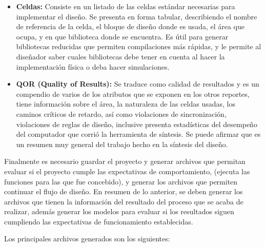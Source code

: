 \begin{itemize}
\item \textbf{Celdas:} {Consiste en un listado de las celdas estándar necesarias para implementar el diseño. Se presenta en forma tabular, describiendo el nombre de referencia de la celda, el bloque de diseño donde es usada, el área que ocupa, y en que biblioteca donde se encuentra. Es útil para generar bibliotecas reducidas que permiten compilaciones más rápidas, y le permite al diseñador saber cuales bibliotecas debe tener en cuenta al hacer la implementación física o deba hacer simulaciones.}


\item \textbf{QOR (Quality of Results):} {Se traduce como calidad de resultados y es un compendio de varios de los atributos que se exponen en los otros reportes, tiene información sobre el área, la naturaleza de las celdas usadas, los caminos críticos de retardo, así como violaciones de sincronización, violaciones de reglas de diseño, inclusive presenta estadísticas del desempeño del computador que corrió la herramienta de síntesis. Se puede afirmar que es un resumen muy general del trabajo hecho en la síntesis del diseño.}
\end{itemize}

Finalmente es necesario guardar el proyecto y generar archivos que permitan evaluar si el proyecto cumple las expectativas de comportamiento, (ejecuta las funciones para las que fue concebido), y generar los archivos que permiten continuar el flujo de diseño. En resumen de lo anterior, se deben generar los archivos que tienen la información del resultado del proceso que se acaba de realizar, además generar los modelos para evaluar si los resultados siguen cumpliendo las expectativas de funcionamiento establecidas.

Los principales archivos generados son los siguientes:

